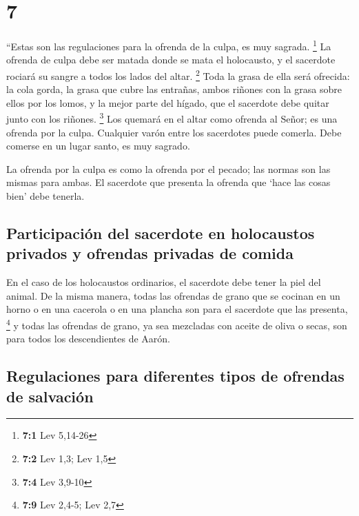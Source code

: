 \hypertarget{section-6}{%
\section{7}\label{section-6}}

 ``Estas son las regulaciones para la ofrenda de la culpa,
es muy sagrada. \footnote{\textbf{7:1} Lev 5,14-26}  La
ofrenda de culpa debe ser matada donde se mata el holocausto, y el
sacerdote rociará su sangre a todos los lados del altar. \footnote{\textbf{7:2}
  Lev 1,3; Lev 1,5}  Toda la grasa de ella será ofrecida:
la cola gorda, la grasa que cubre las entrañas,  ambos
riñones con la grasa sobre ellos por los lomos, y la mejor parte del
hígado, que el sacerdote debe quitar junto con los riñones. \footnote{\textbf{7:4}
  Lev 3,9-10}  Los quemará en el altar como ofrenda al
Señor; es una ofrenda por la culpa.  Cualquier varón entre
los sacerdotes puede comerla. Debe comerse en un lugar santo, es muy
sagrado.

 La ofrenda por la culpa es como la ofrenda por el pecado;
las normas son las mismas para ambas. El sacerdote que presenta la
ofrenda que `hace las cosas bien' debe tenerla.

\hypertarget{participaciuxf3n-del-sacerdote-en-holocaustos-privados-y-ofrendas-privadas-de-comida}{%
\subsection{Participación del sacerdote en holocaustos privados y
ofrendas privadas de
comida}\label{participaciuxf3n-del-sacerdote-en-holocaustos-privados-y-ofrendas-privadas-de-comida}}

 En el caso de los holocaustos ordinarios, el sacerdote
debe tener la piel del animal.  De la misma manera, todas
las ofrendas de grano que se cocinan en un horno o en una cacerola o en
una plancha son para el sacerdote que las presenta, \footnote{\textbf{7:9}
  Lev 2,4-5; Lev 2,7}  y todas las ofrendas de grano, ya
sea mezcladas con aceite de oliva o secas, son para todos los
descendientes de Aarón.

\hypertarget{regulaciones-para-diferentes-tipos-de-ofrendas-de-salvaciuxf3n}{%
\subsection{Regulaciones para diferentes tipos de ofrendas de
salvación}\label{regulaciones-para-diferentes-tipos-de-ofrendas-de-salvaciuxf3n}}

